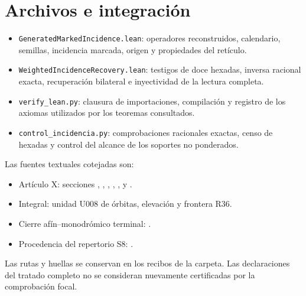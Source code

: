 \documentclass[11pt,a4paper]{article}
\begin{document}
\section{Archivos e integración}

\begin{itemize}
\item \texttt{GeneratedMarkedIncidence.lean}: operadores reconstruidos,
calendario, semillas, incidencia marcada, origen y propiedades del retículo.
\item \texttt{WeightedIncidenceRecovery.lean}: testigos de doce hexadas,
inversa racional exacta, recuperación bilateral e inyectividad de la lectura
completa.
\item \texttt{verify\_lean.py}: clausura de importaciones, compilación y
registro de los axiomas utilizados por los teoremas consultados.
\item \texttt{control\_incidencia.py}: comprobaciones racionales exactas,
censo de hexadas y control del alcance de los soportes no ponderados.
\end{itemize}

Las fuentes textuales cotejadas son:
\begin{itemize}
\item Artículo X: secciones , ,
, ,
,  y .
\item Integral: unidad U008 de órbitas, elevación y frontera R36.
\item Cierre afín--monodrómico terminal:
.
\item Procedencia del repertorio S8:
.
\end{itemize}
Las rutas y huellas se conservan en los recibos de la carpeta. Las
declaraciones del tratado completo no se consideran nuevamente certificadas
por la comprobación focal.
\end{document}
